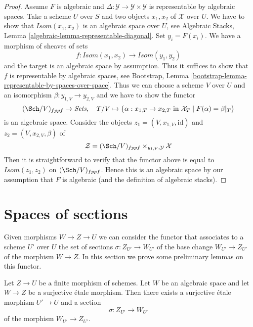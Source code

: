 \begin{proof}
Assume $F$ is algebraic and
$\Delta : \mathcal{Y} \to \mathcal{Y} \times \mathcal{Y}$
is representable by algebraic spaces.
Take a scheme $U$ over $S$ and two objects $x_1, x_2$ of
$\mathcal{X}$ over $U$.
We have to show that $\mathit{Isom}(x_1, x_2)$ is an algebraic space
over $U$, see
Algebraic Stacks, Lemma \ref{algebraic-lemma-representable-diagonal}.
Set $y_i = F(x_i)$. We have a morphism of sheaves of sets
$$
f : \mathit{Isom}(x_1, x_2) \to \mathit{Isom}(y_1, y_2)
$$
and the target is an algebraic space by assumption.
Thus it suffices to show that $f$ is representable by
algebraic spaces, see Bootstrap, Lemma
\ref{bootstrap-lemma-representable-by-spaces-over-space}.
Thus we can choose a scheme $V$ over $U$ and an
isomorphism $\beta : y_{1, V} \to y_{2, V}$ and
we have to show the functor
$$
(\Sch/V)_{fppf} \to \textit{Sets},\quad
T/V \mapsto \{\alpha : x_{1, T} \to x_{2, T}
\text{ in }\mathcal{X}_T \mid F(\alpha) = \beta|_T\}
$$
is an algebraic space. Consider the objects
$z_1 = (V, x_{1, V}, \text{id})$ and 
$z_2 = (V, x_{2, V}, \beta)$ of
$$
\mathcal{Z} = (\Sch/V)_{fppf} \times_{y_{1, V}, \mathcal{Y}} \mathcal{X}
$$
Then it is straightforward to verify that
the functor above is equal to $\mathit{Isom}(z_1, z_2)$
on $(\Sch/V)_{fppf}$. Hence this is an algebraic space
by our assumption that $F$ is algebraic (and the definition
of algebraic stacks).
\end{proof}
















\section{Spaces of sections}
\label{section-spaces-sections}

\noindent
Given morphisms $W \to Z \to U$ we can consider the functor that associates
to a scheme $U'$ over $U$ the set of sections $\sigma : Z_{U'} \to W_{U'}$
of the base change $W_{U'} \to Z_{U'}$ of the morphism $W \to Z$.
In this section we prove some preliminary lemmas on this functor.

\begin{lemma}
\label{lemma-surjection-space-of-sections}
Let $Z \to U$ be a finite morphism of schemes.
Let $W$ be an algebraic space and let $W \to Z$ be a
surjective \'etale morphism. Then there exists a surjective
\'etale morphism $U' \to U$ and a section
$$
\sigma : Z_{U'} \to W_{U'}
$$
of the morphism $W_{U'} \to Z_{U'}$.
\end{lemma}


